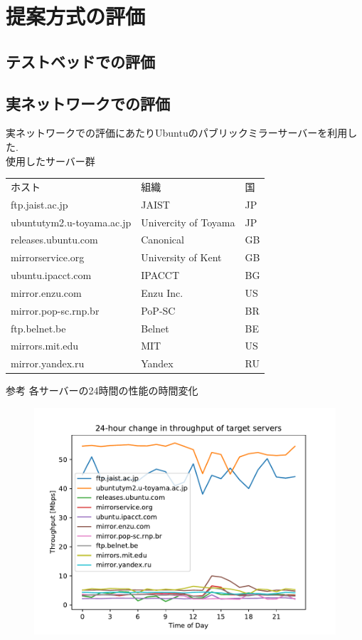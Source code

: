 \documentclass[a4j,12pt]{gradthesis_utf8}
\begin{document}
\section{提案方式の評価}
\subsection{テストベッドでの評価}

\subsection{実ネットワークでの評価}
実ネットワークでの評価にあたりUbuntuのパブリックミラーサーバーを利用した.\\
使用したサーバー群
\begin{table}[htb]
	\begin{tabular}{lll}
		ホスト & 組織 & 国\\
		ftp.jaist.ac.jp & JAIST & JP \\
		ubuntutym2.u-toyama.ac.jp & Univercity of Toyama & JP \\
		releases.ubuntu.com & Canonical & GB \\
		mirrorservice.org & University of Kent & GB \\
		ubuntu.ipacct.com & IPACCT & BG \\
		mirror.enzu.com & Enzu Inc. & US \\
		mirror.pop-sc.rnp.br & PoP-SC & BR \\
		ftp.belnet.be & Belnet & BE \\
		mirrors.mit.edu & MIT & US \\
		mirror.yandex.ru & Yandex & RU \\
	\end{tabular}
\end{table}

参考 各サーバーの24時間の性能の時間変化
\begin{figure}
	\begin{center}
		\includegraphics[width=15cm]{thp24h.pdf}
	\end{center}
\end{figure}
\end{document}
